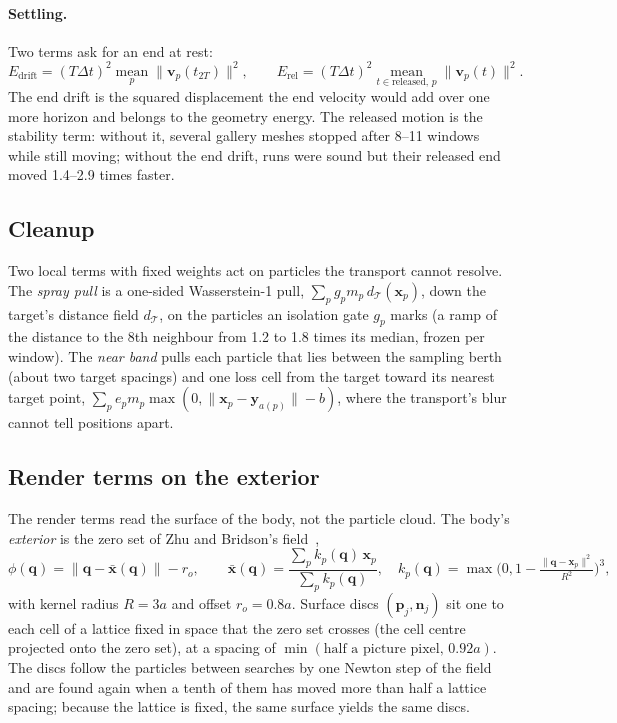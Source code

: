 \paragraph{Settling.} Two terms ask for an end at rest:
\begin{equation}
E_{\mathrm{drift}}=(T\Delta t)^2\operatorname*{mean}_p\lVert\mathbf{v}_p(t_{2T})\rVert^2 ,\qquad
E_{\mathrm{rel}}=(T\Delta t)^2\operatorname*{mean}_{t\in\text{released},\,p}\lVert\mathbf{v}_p(t)\rVert^2 .
\end{equation}
The end drift is the squared displacement the end velocity would add over one more horizon and belongs to the
geometry energy. The released motion is the stability term: without it, several gallery meshes stopped after 8--11
windows while still moving; without the end drift, runs were sound but their released end moved 1.4--2.9 times
faster.

\subsection{Cleanup}
Two local terms with fixed weights act on particles the transport cannot resolve.
The \emph{spray pull} is a one-sided Wasserstein-1 pull, $\sum_p g_p m_p\,d_{\mathcal{T}}(\mathbf{x}_p)$, down the
target's distance field $d_{\mathcal{T}}$, on the particles an isolation gate $g_p$ marks (a ramp of the distance to
the 8th neighbour from 1.2 to 1.8 times its median, frozen per window). The \emph{near band} pulls each particle that
lies between the sampling berth (about two target spacings) and one loss cell from the target toward its nearest
target point, $\sum_p e_p m_p\max(0,\lVert\mathbf{x}_p-\mathbf{y}_{a(p)}\rVert-b)$, where the transport's blur cannot
tell positions apart.

\subsection{Render terms on the exterior}
\label{ch4:sec_exterior}
The render terms read the surface of the body, not the particle cloud. The body's \emph{exterior} is the zero set of
Zhu and Bridson's field~\citep{zhu2005sand},
\begin{equation}
\phi(\mathbf{q})=\lVert\mathbf{q}-\bar{\mathbf{x}}(\mathbf{q})\rVert-r_o,\qquad
\bar{\mathbf{x}}(\mathbf{q})=\frac{\sum_p k_p(\mathbf{q})\,\mathbf{x}_p}{\sum_p k_p(\mathbf{q})},\quad
k_p(\mathbf{q})=\max\!\Big(0,1-\tfrac{\lVert\mathbf{q}-\mathbf{x}_p\rVert^2}{R^2}\Big)^{3},
\end{equation}
with kernel radius $R=3a$ and offset $r_o=0.8a$. Surface discs $(\mathbf{p}_j,\mathbf{n}_j)$ sit one to each cell of a
lattice fixed in space that the zero set crosses (the cell centre projected onto the zero set), at a spacing of
$\min(\text{half a picture pixel},\,0.92a)$. The discs follow the particles between searches by one Newton step of the
field and are found again when a tenth of them has moved more than half a lattice spacing; because the lattice is
fixed, the same surface yields the same discs.

